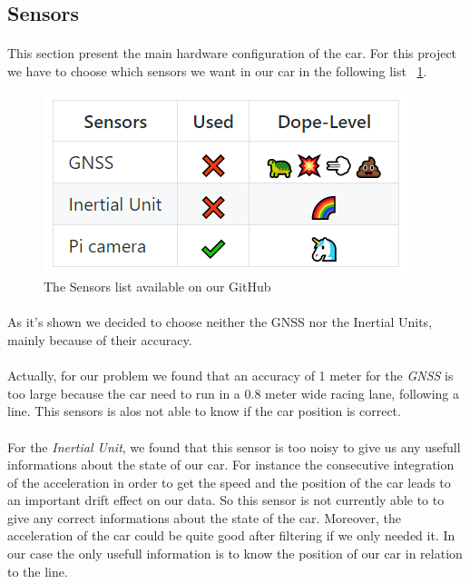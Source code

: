 \subsection{Sensors}

\paragraph{}This section present the main hardware configuration of the car. 
For this project we have to choose which sensors we want in our 
car in the following list ~\ref{fig:sensors}.

\begin{figure}[!ht]
    \begin{center}
        \includegraphics[scale=0.6]{Images/Sensors.png}
    \end{center}
    \caption{The Sensors list available on our GitHub}
    \label{fig:sensors}
\end{figure}

\paragraph{}
As it's shown we decided to choose neither the GNSS nor the Inertial 
Units, mainly because of their accuracy.

\paragraph{}
Actually, for our problem we found that an accuracy of 1 meter
for the \textit{GNSS} is too large because the car need to run in a 0.8 meter
wide racing lane, following a line. This sensors is alos not able to know if
the car position is correct.

\paragraph{}
For the \textit{Inertial Unit}, we found that this sensor is too noisy to
give us any usefull informations about the state of our car. For instance the
consecutive integration of the acceleration in order to get the speed and the
position of the car leads to an important drift effect on our data. So this
sensor is not currently able to to give any correct informations about the state
of the car. Moreover, the acceleration of the car could be quite good after filtering
if we only needed it. In our case the only usefull information is to know the
position of our car in relation to the line.

